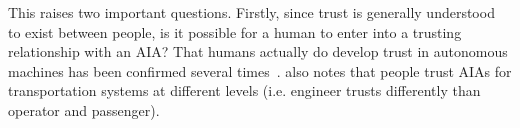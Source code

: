         This raises two important questions. Firstly, since trust is generally understood to exist between people, is it possible for a human to enter into a trusting relationship with an AIA? 
        That humans actually do develop trust in autonomous machines has been confirmed several times~\cite{Muir1996-gt,Mcknight2011-gv,Riley1996-qm,Bainbridge2011-pl,Salem2015-md,Desai2012-rc, Freedy2007-sg, Kaniarasu2013-ho, Wang2016-id}. 
        \citet{Lacher2014-yc} also notes that people trust AIAs for transportation systems at different levels (i.e. engineer trusts differently than operator and passenger). 
